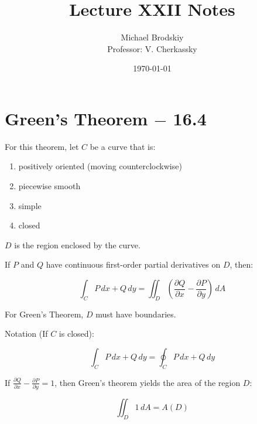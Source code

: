 \documentclass[12pt]{article}
\title{Lecture XXII Notes}
\date{\today}
\author{Michael Brodskiy\\ \small Professor: V. Cherkassky}
\begin{document}
\maketitle

\section{Green's Theorem $-$ 16.4}

For this theorem, let $C$ be a curve that is:

\begin{enumerate}

  \item positively oriented (moving counterclockwise)

  \item piecewise smooth

  \item simple

  \item closed

\end{enumerate}

$D$ is the region enclosed by the curve.

If $P$ and $Q$ have continuous first-order partial derivatives on $D$, then:

$$\int_C P\,dx+Q\,dy=\iint_D \left(\frac{\partial Q}{\partial x}-\frac{\partial P}{\partial y}\right)\,dA$$

For Green's Theorem, $D$ must have boundaries.

Notation (If $C$ is closed):

$$\int_C P\,dx+Q\,dy=\oint_C P\,dx+Q\,dy$$

If $\frac{\partial Q}{\partial x}-\frac{\partial P}{\partial y}=1$, then Green's theorem yields the area of the region $D$:

$$\iint_D 1\,dA=A(D)$$
\end{document}
